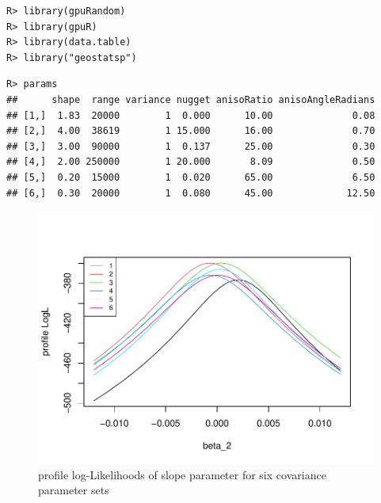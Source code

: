 \documentclass{article}\usepackage[]{graphicx}\usepackage[]{color}
\makeatletter
\def\maxwidth{ %
  \ifdim\Gin@nat@width>\linewidth
    \linewidth
  \else
    \Gin@nat@width
  \fi
}
\newenvironment{kframe}{%
 \def\at@end@of@kframe{}%
 \ifinner\ifhmode%
  \def\at@end@of@kframe{\end{minipage}}%
  \begin{minipage}{\columnwidth}%
 \fi\fi%
 \def\FrameCommand##1{\hskip\@totalleftmargin \hskip-\fboxsep
 \colorbox{shadecolor}{##1}\hskip-\fboxsep
     \hskip-\linewidth \hskip-\@totalleftmargin \hskip\columnwidth}%
 \MakeFramed {\advance\hsize-\width
   \@totalleftmargin\z@ \linewidth\hsize
   \@setminipage}}%
 {\par\unskip\endMakeFramed%
 \at@end@of@kframe}
\newenvironment{knitrout}{}{} %
\makeatother
\begin{document}
\begin{knitrout}
\color{fgcolor}\begin{kframe}
\begin{verbatim}
R> library(gpuRandom)
R> library(gpuR)
R> library(data.table)
R> library("geostatsp")
\end{verbatim}
\end{kframe}
\end{knitrout}


\begin{knitrout}
\color{fgcolor}\begin{kframe}
\begin{verbatim}
R> params
##      shape  range variance nugget anisoRatio anisoAngleRadians
## [1,]  1.83  20000        1  0.000      10.00              0.08
## [2,]  4.00  38619        1 15.000      16.00              0.70
## [3,]  3.00  90000        1  0.137      25.00              0.30
## [4,]  2.00 250000        1 20.000       8.09              0.50
## [5,]  0.20  15000        1  0.020      65.00              6.50
## [6,]  0.30  20000        1  0.080      45.00             12.50
\end{verbatim}
\end{kframe}
\end{knitrout}




\begin{knitrout}
\color{fgcolor}\begin{figure}[H]

{\centering \includegraphics[width=\maxwidth]{figure/matplot_beta-1} 

}

\caption[profile log-Likelihoods of slope parameter for six covariance parameter sets]{profile log-Likelihoods of slope parameter for six covariance parameter sets}\label{fig:matplot_beta}
\end{figure}

\end{knitrout}
\end{document}
